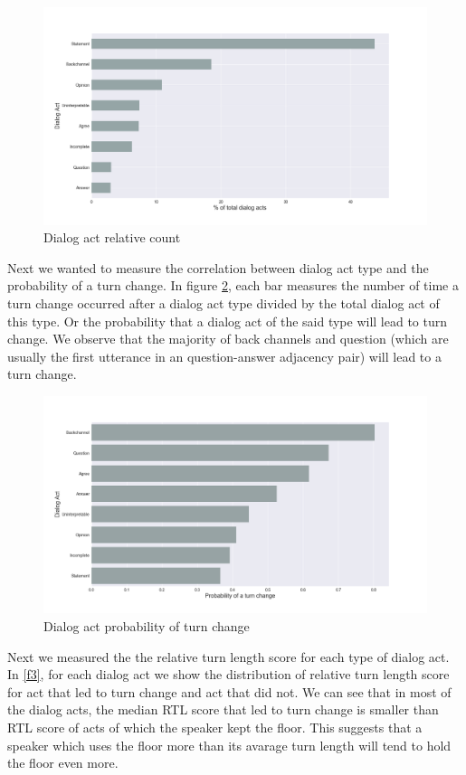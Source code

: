  \begin{figure}[ht!]
 \centering
 \includegraphics[width=\textwidth]{../scikitlearn/figures/f1.png}
 \caption{Dialog act relative count\label{overflow}}
 \label{f1}
 \end{figure}

Next we wanted to measure the correlation between dialog act type and the probability of a turn change.  In figure \ref{f2}, each bar measures the number of time a turn change occurred after a dialog act type divided by the total dialog act of this type. Or the probability that a dialog act of the said type will lead to turn change. We observe that the majority of back channels and question (which are usually the first utterance in an question-answer adjacency pair) will lead to a turn change.

\begin{figure}[ht!]
\centering
\includegraphics[width=\textwidth]{../scikitlearn/figures/f2.png}
\caption{Dialog act probability of turn change\label{overflow}}
\label{f2}
\end{figure}

Next we measured the the relative turn length score for each type of dialog act.
In \ref{f3}, for each dialog act we show the distribution of relative turn length score for act that
led to turn change and act that did not. We can see that in most of the dialog acts,
the median RTL score that led to turn change is smaller than RTL score of acts of which
the speaker kept the floor. This suggests that a speaker which uses the floor more than its
avarage turn length will tend to hold the floor even more.
 

